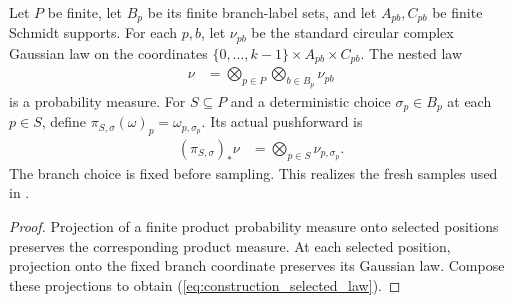 \begin{definition}
    \label{def:construction_global_law}
    \leanok
    Let $P$ be finite, let $B_p$ be its finite branch-label sets, and
    let $A_{pb},C_{pb}$ be finite Schmidt supports. For each $p,b$,
    let $\nu_{pb}$ be the standard circular complex Gaussian law on
    the coordinates $\{0,\ldots,k-1\}\times A_{pb}\times C_{pb}$.
    The nested law
    \begin{align}
        \nu & =\bigotimes_{p\in P}\bigotimes_{b\in B_p}\nu_{pb}
        \label{eq:construction_global_law}
    \end{align}
    is a probability measure. For $S\subseteq P$ and a deterministic
    choice $\sigma_p\in B_p$ at each $p\in S$, define
    $\pi_{S,\sigma}(\omega)_p=\omega_{p,\sigma_p}$.
    Its actual pushforward is
    \begin{align}
        (\pi_{S,\sigma})_*\nu & =\bigotimes_{p\in S}\nu_{p,\sigma_p}.
        \label{eq:construction_selected_law}
    \end{align}
    The branch choice is fixed before sampling. This realizes the fresh
    samples used in \cite[Theorem~5.2]{OpenAI2026PolynomialPEPS}.
\end{definition}

\begin{proof}\leanok
    Projection of a finite product probability measure onto selected
    positions preserves the corresponding product measure.
    At each selected position, projection onto the fixed branch
    coordinate preserves its Gaussian law. Compose these projections
    to obtain (\ref{eq:construction_selected_law}).
\end{proof}

